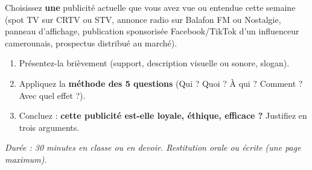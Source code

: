 \documentclass[11pt]{article}
\begin{document}
\begin{exercice}
Choisissez \textbf{une} publicité actuelle que vous avez vue ou entendue cette semaine (spot TV sur CRTV ou STV, annonce radio sur Balafon FM ou Nostalgie, panneau d'affichage, publication sponsorisée Facebook/TikTok d'un influenceur camerounais, prospectus distribué au marché).
\begin{enumerate}
    \item Présentez-la brièvement (support, description visuelle ou sonore, slogan).
    \item Appliquez la \textbf{méthode des 5 questions} (Qui ? Quoi ? À qui ? Comment ? Avec quel effet ?).
    \item Concluez : \textbf{cette publicité est-elle loyale, éthique, efficace ?} Justifiez en trois arguments.
\end{enumerate}
\textit{Durée : 30 minutes en classe ou en devoir. Restitution orale ou écrite (une page maximum).}
\end{exercice}
\end{document}
